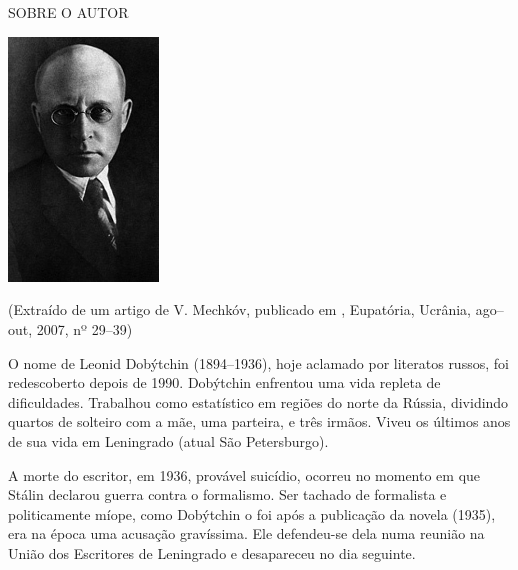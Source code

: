 \clearpage
\thispagestyle{empty}

\movetooddpage
\small\MyriadPro\itshape
\label{colaboradores}

\noindent{}SOBRE O AUTOR\\

\begin{center}
\includegraphics[width=4cm]{./autor.jpg}
\end{center}

\epigraph{{}}{(Extraído de um artigo de V. Mechkóv, publicado em {}, Eupatória, Ucrânia, ago–out, 2007, nº 29–39)}

O nome de Leonid Dobýtchin (1894–1936), hoje aclamado por literatos
russos, foi redescoberto depois de 1990. Dobýtchin enfrentou uma vida
repleta de dificuldades. Trabalhou como estatístico em regiões do norte
da Rússia, dividindo quartos de solteiro com a mãe, uma parteira, e três
irmãos. Viveu os últimos anos de sua vida em Leningrado (atual São
Petersburgo).

A morte do escritor, em 1936, provável suicídio, ocorreu no momento em
que Stálin declarou guerra contra o formalismo. Ser tachado de
formalista e politicamente míope, como Dobýtchin o foi após a publicação
da novela {} (1935), era na época uma acusação
gravíssima. Ele defendeu-se dela numa reunião na União dos Escritores de
Leningrado e desapareceu no dia seguinte.

